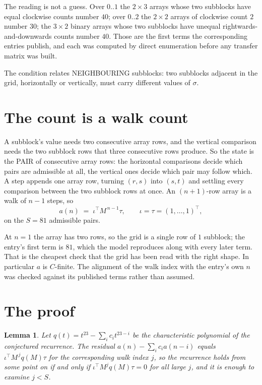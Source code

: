 \documentclass[11pt,a4paper]{article}
\theoremstyle{plain}
\newtheorem{lemma}[theorem]{Lemma}
\theoremstyle{definition}
\begin{document}
The reading is not a guess. Over $0..1$ the $2\times3$ arrays whose two subblocks have equal
clockwise counts number $40$; over $0..2$ the $2\times2$ arrays of clockwise count $2$ number
$30$; the $3\times2$ binary arrays whose two subblocks have unequal rightwards-and-downwards
counts number $40$. Those are the first terms the corresponding entries publish, and each was
computed by direct enumeration before any transfer matrix was built.

The condition relates NEIGHBOURING subblocks: two subblocks adjacent in the grid, horizontally
or vertically, must carry different values of $\sigma$.

\section{The count is a walk count}

A subblock's value needs two consecutive array rows, and the vertical
comparison needs the two subblock rows that three consecutive rows produce. So the state is the
PAIR of consecutive array rows: the horizontal comparisons decide which pairs are admissible at
all, the vertical ones decide which pair may follow which. A step appends one array row,
turning $(r,s)$ into $(s,t)$ and settling every comparison between the two subblock rows at
once. An $(n+1)$-row array is a walk of $n-1$ steps, so
\[
a(n)\;=\;\iota^{\!\top}M^{\,n-1}\tau,\qquad\iota=\tau=(1,\dots,1)^{\!\top},
\]
on the $S=81$ admissible pairs.

At $n=1$ the array has two rows, so the grid is a single row of $1$
subblock; the entry's first term is $81$, which the model
reproduces along with every later term. That is the cheapest check that the grid has been read
with the right shape.
In particular $a$ is $C$-finite. The alignment of the walk index with the entry's own $n$ was
checked against its published terms rather than assumed.

\section{The proof}

\begin{lemma}\label{lem:crit}
Let $q(t)=t^{23}-\sum_i c_it^{23-i}$ be the characteristic polynomial of the
conjectured recurrence. The residual $a(n)-\sum_ic_ia(n-i)$ equals
$\iota^{\!\top}M^{\,j}q(M)\tau$ for the corresponding walk index $j$, so the recurrence
holds from some point on if and only if $\iota^{\!\top}M^{j}q(M)\tau=0$ for all large $j$,
and it is enough to examine $j<S$.
\end{lemma}
\end{document}
